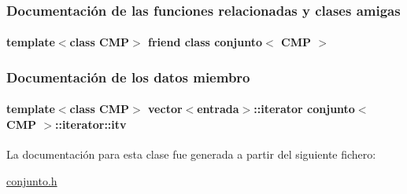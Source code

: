 \subsubsection{Documentación de las funciones relacionadas y clases amigas}
\hypertarget{classconjunto_1_1iterator_a447db18bedcb8f88250a3d1789570e0a}{
\paragraph[{conjunto$<$ C\-M\-P $>$}]{\setlength{\rightskip}{0pt plus 5cm}template$<$class C\-M\-P$>$ friend class {\bf conjunto}$<$ C\-M\-P $>$\hspace{0.3cm}{\ttfamily [friend]}}}\label{classconjunto_1_1iterator_a447db18bedcb8f88250a3d1789570e0a}


\subsubsection{Documentación de los datos miembro}
\hypertarget{classconjunto_1_1iterator_a670501cc6724497877d7a131efe50e60}{
\paragraph[{itv}]{\setlength{\rightskip}{0pt plus 5cm}template$<$class C\-M\-P$>$ vector$<${\bf entrada}$>$\-::{\bf iterator} {\bf conjunto}$<$ C\-M\-P $>$\-::iterator\-::itv\hspace{0.3cm}{\ttfamily [private]}}}\label{classconjunto_1_1iterator_a670501cc6724497877d7a131efe50e60}


La documentación para esta clase fue generada a partir del siguiente fichero\-:\begin{DoxyCompactItemize}
\item 
\hyperlink{conjunto_8h}{conjunto.\-h}\end{DoxyCompactItemize}
